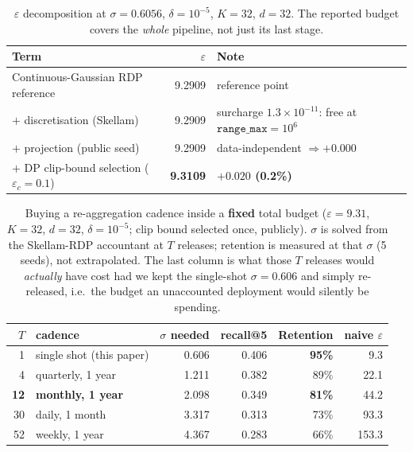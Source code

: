 \documentclass[conference]{IEEEtran}
\theoremstyle{remark}
\newcommand{\eps}{\varepsilon}
\begin{document}
\begin{table}[t]
  \centering
  \caption{$\eps$ decomposition at $\sigma = 0.6056$, $\delta = 10^{-5}$, $K = 32$,
  $d = 32$. The reported budget covers the \emph{whole} pipeline, not just its last stage.}
  \label{tab:eps-decomp}
  \footnotesize
  \begin{tabular}{@{}lrl@{}}
    \toprule
    Term & $\eps$ & Note \\
    \midrule
    Continuous-Gaussian RDP reference   & 9.2909          & reference point \\
    $+$ discretisation (Skellam)        & 9.2909          & surcharge $1.3 \times 10^{-11}$: free at $\texttt{range\_max} = 10^{6}$ \\
    $+$ projection (public seed)        & 9.2909          & data-independent $\Rightarrow +0.000$ \\
    $+$ DP clip-bound selection ($\eps_c = 0.1$) & \textbf{9.3109} & \textbf{$+0.020$ (0.2\%)} \\
    \bottomrule
  \end{tabular}
\end{table}
\begin{table}[t]
  \centering
  \caption{Buying a re-aggregation cadence inside a \textbf{fixed} total budget
  ($\eps = 9.31$, $K = 32$, $d = 32$, $\delta = 10^{-5}$; clip bound selected once,
  publicly). $\sigma$ is solved from the Skellam-RDP accountant at $T$ releases;
  retention is measured at that $\sigma$ (5 seeds), not extrapolated. The last column is
  what those $T$ releases would \emph{actually} have cost had we kept the single-shot
  $\sigma = 0.606$ and simply re-released, i.e.\ the budget an unaccounted deployment
  would silently be spending.}
  \label{tab:multiround}
  \begin{tabular}{@{}rlrrrr@{}}
    \toprule
    $T$ & cadence & $\sigma$ needed & recall@5 & Retention & naive $\eps$ \\
    \midrule
    1  & single shot (this paper) & 0.606 & 0.406 & \textbf{95\%} & 9.3 \\
    4  & quarterly, 1 year        & 1.211 & 0.382 & 89\% & 22.1 \\
    \textbf{12} & \textbf{monthly, 1 year} & 2.098 & 0.349 & \textbf{81\%} & 44.2 \\
    30 & daily, 1 month           & 3.317 & 0.313 & 73\% & 93.3 \\
    52 & weekly, 1 year           & 4.367 & 0.283 & 66\% & 153.3 \\
    \bottomrule
  \end{tabular}
\end{table}
\end{document}
